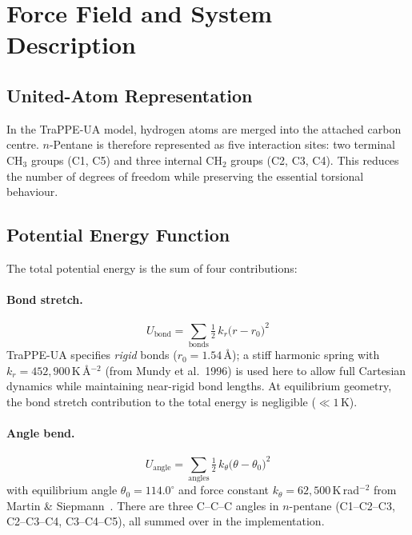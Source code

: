 \documentclass[12pt,a4paper]{article}
\begin{document}
\section{Force Field and System Description}
\label{sec:ff}

\subsection{United-Atom Representation}
In the TraPPE-UA model, hydrogen atoms are merged into the attached carbon
centre.  $n$-Pentane is therefore represented as five interaction sites:
two terminal CH$_3$ groups (C1, C5) and three internal CH$_2$ groups
(C2, C3, C4).  This reduces the number of degrees of freedom while
preserving the essential torsional behaviour.

\subsection{Potential Energy Function}
The total potential energy is the sum of four contributions:

\paragraph{Bond stretch.}
\begin{equation}
  U_{\mathrm{bond}} = \sum_{\text{bonds}} \tfrac{1}{2}\, k_r \bigl(r - r_0\bigr)^2
  \label{eq:bond}
\end{equation}
TraPPE-UA specifies \emph{rigid} bonds ($r_0 = 1.54$\,\AA); a stiff harmonic
spring with $k_r = 452{,}900$\,K\,\AA$^{-2}$ (from Mundy et al.\ 1996) is
used here to allow full Cartesian dynamics while maintaining near-rigid bond
lengths.  At equilibrium geometry, the bond stretch contribution to the
total energy is negligible ($\ll 1$\,K).

\paragraph{Angle bend.}
\begin{equation}
  U_{\mathrm{angle}} = \sum_{\text{angles}} \tfrac{1}{2}\, k_\theta
  \bigl(\theta - \theta_0\bigr)^2
  \label{eq:angle}
\end{equation}
with equilibrium angle $\theta_0 = 114.0^{\circ}$ and force constant
$k_\theta = 62{,}500$\,K\,rad$^{-2}$ from Martin \& Siepmann~\citeyear{Martin1998}.
There are three C--C--C angles in $n$-pentane (C1--C2--C3, C2--C3--C4,
C3--C4--C5), all summed over in the implementation.
\end{document}

